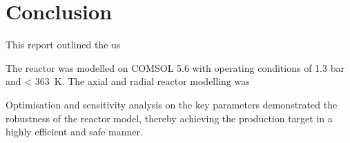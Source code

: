 \section{Conclusion} \label{sec:conclusion}
This report outlined the us


The reactor was modelled on COMSOL 5.6 with operating conditions of 1.3 bar and \SI{< 363}{\K}.
The axial and radial reactor modelling was 

Optimisation and sensitivity analysis on the key parameters demonstrated the robustness of the reactor model, thereby achieving the production target in a highly efficient and safe manner. 